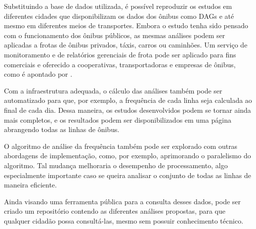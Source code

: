 Substituindo a base de dados utilizada, é possível reproduzir os estudos em diferentes cidades que disponibilizam os dados dos ônibus como DAGs e até mesmo em diferentes meios de transportes. Embora o estudo tenha sido pensado com o funcionamento dos ônibus públicos, as mesmas análises podem ser aplicadas a frotas de ônibus privados, táxis, carros ou caminhões. Um serviço de monitoramento e de relatórios gerenciais de frota pode ser aplicado para fins comerciais e oferecido a cooperativas, transportadoras e empresas de ônibus, como é apontado por \cite{REF_MONO_BUUS}.

Com a infraestrutura adequada, o cálculo das análises também pode ser automatizado para que, por exemplo, a frequência de cada linha seja calculada ao final de cada dia. Dessa maneira, os estudos desenvolvidos podem se tornar ainda mais completos, e os resultados podem ser disponibilizados em uma página abrangendo todas as linhas de ônibus.

O algoritmo de análise da frequência também pode ser explorado com outras abordagens de implementação, como, por exemplo, aprimorando o paralelismo do algoritmo. Tal mudança melhoraria o desempenho de processamento, algo especialmente importante caso se queira analisar o conjunto de todas as linhas de maneira eficiente.

Ainda visando uma ferramenta pública para a consulta desses dados, pode ser criado um repositório contendo as diferentes análises propostas, para que qualquer cidadão possa consultá-las, mesmo sem possuir conhecimento técnico.